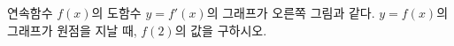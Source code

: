 \noindent\begin{minipage}[t]{0.58\linewidth}\vspace{0pt}\raggedright 연속함수 $f(x)$의 도함수 $y=f'(x)$의 그래프가 오른쪽 그림과 같다. $y=f(x)$의 그래프가 원점을 지날 때, $f(2)$의 값을 구하시오.\end{minipage}\hfill\begin{minipage}[t]{0.4\linewidth}\vspace{0pt}\centering \resizebox{\ifdim\width>\linewidth\linewidth\else\width\fi}{!}{}\end{minipage}\par
